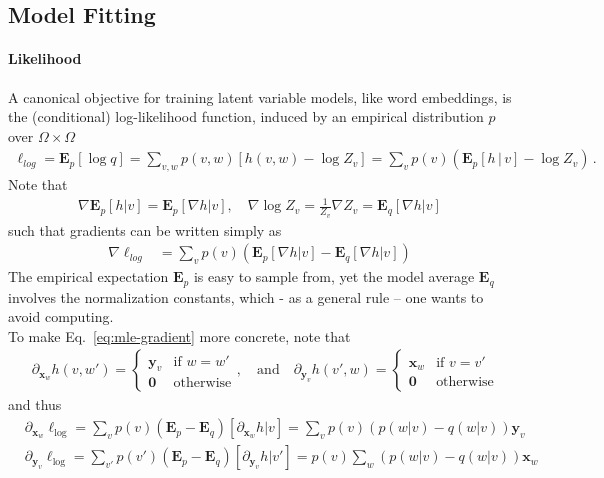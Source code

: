 \documentclass{article}
\newcommand{\E}{{\mathbf E}}
\newcommand{\x}{{\mathbf x}}
\newcommand{\y}{{\mathbf y}}
\begin{document}
\subsection*{Model Fitting}

\paragraph{Likelihood}

A canonical objective for training latent variable models, like word embeddings, is  the (conditional) log-likelihood function, induced by an empirical distribution $p$ over $\Omega \times \Omega$
\begin{align}
\ell_{log}
= \E_p\left[\log q \right]
=  \sum_{v,w} p(v,w) \left[ h(v,w)- \log Z_v \right] = \sum_v p(v) \left( \E_p[ h \,|\,v]  - \log Z_v \right) \,.
\end{align} 
Note that
\begin{align}
\nabla \E_p[ h|v] = \E_p[\nabla h | v], \quad \nabla \log Z_v = \frac{1}{Z_v} \nabla Z_v =  \E_q[\nabla h | v]
\end{align}
such that  gradients can be written simply as 
\begin{align}
\nabla \ell_{log}& = \sum_v  p(v)\left( \E_p[ \nabla h | v] - \E_q[ \nabla h |  v] \right) 
\label{eq:mle-gradient}
\end{align}
The empirical expectation $\E_p$ is easy to sample from, yet the model average $\E_q$ involves the normalization constants, which - as a general rule -- one wants to avoid computing. \\

\noindent To make Eq.~\eqref{eq:mle-gradient} more concrete, note that
\begin{align}
& \partial_{\x_w} h(v,w') =  \begin{cases} 
	\y_v & \text{if $w=w'$}\\
	\mathbf 0 & \text{otherwise}
\end{cases}
, \quad \text{and} \quad 
\partial_{\y_v} h(v',w) = 
	\begin{cases}
		\x_w & \text{if $v=v'$} \\
 		\mathbf 0 & \text{otherwise}
 	\end{cases}
\end{align} 
and thus
\begin{align}
& \partial_{\x_w} \ell_{\log} = \sum_v p(v) (\E_{p}- \E_q) [\partial_{\x_w} h |v] =\sum_v p(v) (p(w|v) - q(w|v))\y_v \\
& \partial_{\y_v} \ell_{\log} =  \sum_{v'} p(v') (\E_{p}- \E_q) [\partial_{\y_v} h |v'] = p(v) \sum_w (p(w|v) - q(w|v)) \x_w
\end{align} 
\end{document}
